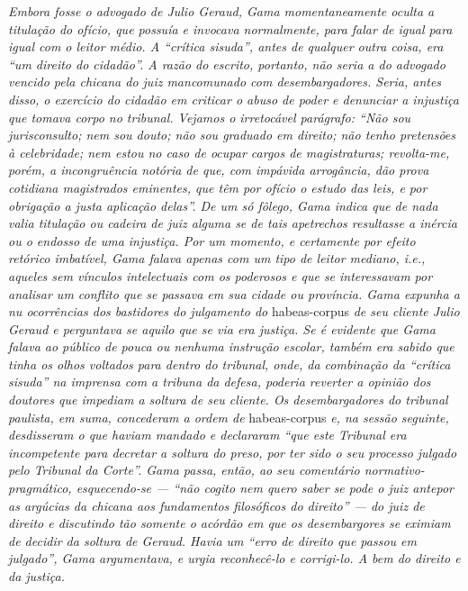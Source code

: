 \begin{didascalia}
\emph{Embora fosse o advogado de Julio Geraud, Gama momentaneamente
oculta a titulação do ofício, que possuía e invocava normalmente, para
falar de igual para igual com o leitor médio. A ``crítica sisuda'', antes
de qualquer outra coisa, era ``um direito do cidadão''. A razão do
escrito, portanto, não seria a do advogado vencido pela chicana do juiz
mancomunado com desembargadores. Seria, antes disso, o exercício do
cidadão em criticar o abuso de poder e denunciar a injustiça que tomava
corpo no tribunal. Vejamos o irretocável parágrafo: ``Não sou
jurisconsulto; nem sou douto; não sou graduado em direito; não tenho
pretensões à celebridade; nem estou no caso de ocupar cargos de
magistraturas; revolta-me, porém, a incongruência notória de que, com
impávida arrogância, dão prova cotidiana magistrados eminentes, que têm
por ofício o estudo das leis, e por obrigação a justa aplicação delas''.
De um só fôlego, Gama indica que de nada valia titulação ou cadeira de
juiz alguma se de tais apetrechos resultasse a inércia ou o endosso de
uma injustiça. Por um momento, e certamente por efeito retórico
imbatível, Gama falava apenas com um tipo de leitor mediano, i.e.,
aqueles sem vínculos intelectuais com os poderosos e que se interessavam
por analisar um conflito que se passava em sua cidade ou província. Gama
expunha a nu ocorrências dos bastidores do julgamento do} habeas-corpus
\emph{de seu cliente Julio Geraud e perguntava se aquilo que se via era
justiça. Se é evidente que Gama falava ao público de pouca ou nenhuma
instrução escolar, também era sabido que tinha os olhos voltados para
dentro do tribunal, onde, da combinação da ``crítica sisuda'' na imprensa
com a tribuna da defesa, poderia reverter a opinião dos doutores que
impediam a soltura de seu cliente. Os desembargadores do tribunal
paulista, em suma, concederam a ordem de} habeas-corpus \emph{e, na
sessão seguinte, desdisseram o que haviam mandado e declararam ``que este
Tribunal era incompetente para decretar a soltura do preso, por ter sido
o seu processo julgado pelo Tribunal da Corte''. Gama passa, então, ao
seu comentário normativo-pragmático, esquecendo-se --- ``não cogito nem
quero saber se pode o juiz antepor as argúcias da chicana aos
fundamentos filosóficos do direito'' --- do juiz de direito e discutindo
tão somente o acórdão em que os desembargores se eximiam de decidir da
soltura de Geraud. Havia um ``erro de direito que passou em julgado'',
Gama argumentava, e urgia reconhecê-lo e corrigi-lo. A bem do direito e
da justiça.}
\end{didascalia}

